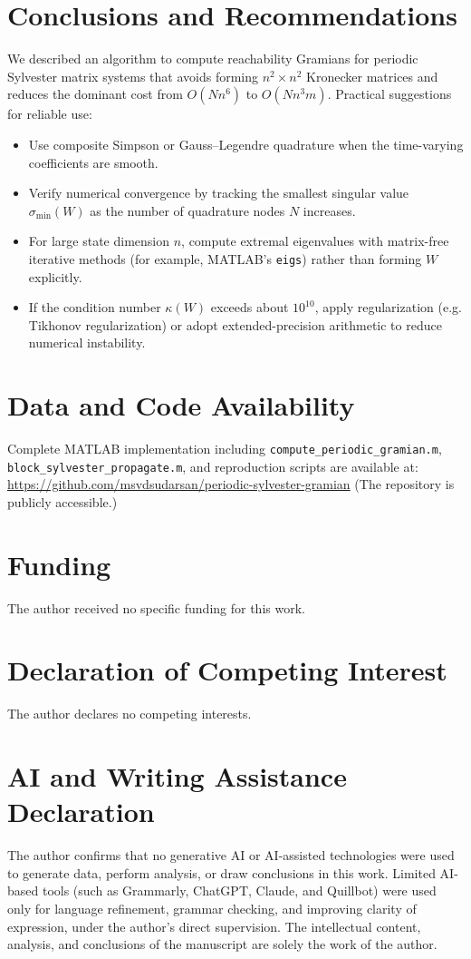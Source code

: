 \documentclass[5p,times]{elsarticle} %
\begin{document}
\section{Conclusions and Recommendations}
We described an algorithm to compute reachability Gramians for periodic Sylvester matrix systems that avoids forming \(n^2\times n^2\) Kronecker matrices and reduces the dominant cost from \(O(N n^6)\) to \(O(N n^3 m)\). Practical suggestions for reliable use:
\begin{itemize}
\item Use composite Simpson or Gauss--Legendre quadrature when the time-varying coefficients are smooth.
\item Verify numerical convergence by tracking the smallest singular value \(\sigma_{\min}(W)\) as the number of quadrature nodes \(N\) increases.
\item For large state dimension \(n\), compute extremal eigenvalues with matrix-free iterative methods (for example, MATLAB's \texttt{eigs}) rather than forming \(W\) explicitly.
\item If the condition number \(\kappa(W)\) exceeds about \(10^{10}\), apply regularization (e.g. Tikhonov regularization) or adopt extended-precision arithmetic to reduce numerical instability.
\end{itemize}

\section*{Data and Code Availability}
{\raggedright
Complete MATLAB implementation including \texttt{compute\_periodic\_gramian.m},
\texttt{block\_sylvester\_propagate.m}, and reproduction scripts are available at:
\url{https://github.com/msvdsudarsan/periodic-sylvester-gramian}
(The repository is publicly accessible.)
\par}

\section*{Funding}
The author received no specific funding for this work.

\section*{Declaration of Competing Interest}
The author declares no competing interests.

\section*{AI and Writing Assistance Declaration}
The author confirms that no generative AI or AI-assisted technologies were used to generate data, perform analysis, or draw conclusions in this work. Limited AI-based tools (such as Grammarly, ChatGPT, Claude, and Quillbot) were used only for language refinement, grammar checking, and improving clarity of expression, under the author’s direct supervision. The intellectual content, analysis, and conclusions of the manuscript are solely the work of the author.
\end{document}
